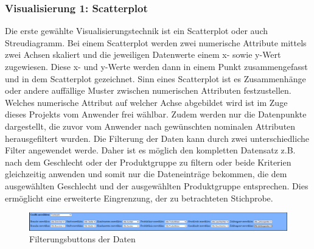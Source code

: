 \documentclass[usegeometry=true]{scrartcl}
\begin{document}
\subsubsection{Visualisierung 1: Scatterplot}\label{Visualisierung1}
Die erste gewählte Visualisierungstechnik ist ein Scatterplot oder auch Streudiagramm. Bei einem Scatterplot werden zwei numerische Attribute mittels zwei Achsen skaliert und die
jeweiligen Datenwerte einem x- sowie y-Wert zugewiesen. Diese x- und y-Werte werden dann in einem Punkt zusammengefasst und in dem Scatterplot gezeichnet. Sinn eines Scatterplot
ist es Zusammenhänge oder andere auffällige Muster zwischen numerischen Attributen festzustellen. \cite[103]{Friendly2005} Welches numerische Attribut auf welcher Achse
abgebildet wird ist im Zuge dieses Projekts vom Anwender frei wählbar. Zudem werden nur die Datenpunkte dargestellt, die zuvor vom Anwender nach gewünschten nominalen
Attributen herausgefiltert wurden. Die Filterung der Daten kann durch zwei unterschiedliche Filter angewendet werde. Daher ist es möglich den kompletten Datensatz z.B. nach
dem Geschlecht oder der Produktgruppe zu filtern oder beide Kriterien gleichzeitig anwenden und somit nur die Dateneinträge bekommen, die dem ausgewählten Geschlecht und der
ausgewählten Produktgruppe entsprechen. Dies ermöglicht eine erweiterte Eingrenzung, der zu betrachteten Stichprobe. \\
\begin{figure} [H]
	\begin{center}
		\includegraphics[width=16cm]{IMG/Filterung}
		\caption{Filterungsbuttons der Daten}
		\label{fig:Filterung}
	\end{center}
\end{figure}
\end{document}
